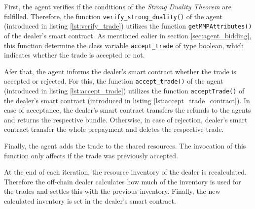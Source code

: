 First, the agent verifies if the conditions of the \textit{Strong Duality Theorem}
are fulfilled.
Therefore, the function \verb|verify_strong_duality()| of the agent
(introduced in listing \ref{lst:verify_trade})
utilizes the function \verb|getMMPAttributes()| of the dealer's smart contract.
As mentioned ealier in section \ref{sec:agent_bidding}, this function 
determine the class variable \verb|accept_trade| of type boolean,
which indicates whether the trade is accepted or not.

Afer that, the agent informs the dealer's smart contract whether 
the trade is accepted or rejected.
For this, the function \verb|accept_trade()| of the agent
(introduced in listing \ref{lst:accept_trade})
utilizes the function \verb|acceptTrade()| of the dealer's smart contract
(introduced in listing \ref{lst:accept_trade_contract}).
In case of acceptance, the dealer's smart contract transfers the refunds 
to the agents and returns the respective bundle. Otherwise, in case of  
rejection, dealer's smart contract transfer the whole prepayment 
and deletes the respective trade.

Finally, the agent adds the trade to the shared resources. The invocation
of this function only affects if the trade was previously accepted. \newline

At the end of each iteration, the resource inventory of the dealer is recalculated.
Therefore the off-chain dealer calculates how much of the inventory is used for
the trades and settles this with the previous inventory.
Finally, the new calculated inventory is set in the dealer's smart contract.
